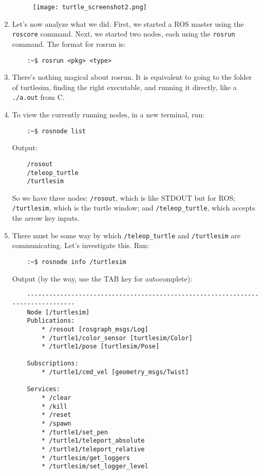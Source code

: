 \documentclass{article}
\begin{document}
\begin{enumerate}
        \begin{figure}[H]
            \center
            \texttt{[image: turtle\_screenshot2.png]}
        \end{figure}

        \item Let's now analyze what we did. First, we started a ROS master using the \texttt{roscore} 
        command. Next, we started two nodes, each using the \texttt{rosrun} command. The format for rosrun is:
        \begin{verbatim}
    :~$ rosrun <pkg> <type>
        \end{verbatim}
        \item There's nothing magical about rosrun. It is equivalent to going to the folder of turtlesim,
        finding the right executable, and running it directly, like a \texttt{./a.out} from C.
        \item To view the currently running nodes, in a new terminal, run:
        \begin{verbatim}
    :~$ rosnode list
        \end{verbatim}
        Output:
        \begin{verbatim}
    /rosout
    /teleop_turtle
    /turtlesim
        \end{verbatim}
        So we have three nodes: \texttt{/rosout}, which is like STDOUT but for ROS; \texttt{/turtlesim}, which is the turtle window;
         and \texttt{/teleop\_turtle}, which accepts the arrow key inputs.
        \item There must be some way by which \texttt{/teleop\_turtle} and \texttt{/turtlesim} are communicating.
        Let's investigate this. Run:
        \begin{verbatim}
    :~$ rosnode info /turtlesim
        \end{verbatim}
        \newpage
        Output (by the way, use the TAB key for autocomplete):
        \begin{verbatim}
    --------------------------------------------------------------------------------
    Node [/turtlesim]
    Publications: 
        * /rosout [rosgraph_msgs/Log]
        * /turtle1/color_sensor [turtlesim/Color]
        * /turtle1/pose [turtlesim/Pose]
    
    Subscriptions: 
        * /turtle1/cmd_vel [geometry_msgs/Twist]
    
    Services: 
        * /clear
        * /kill
        * /reset
        * /spawn
        * /turtle1/set_pen
        * /turtle1/teleport_absolute
        * /turtle1/teleport_relative
        * /turtlesim/get_loggers
        * /turtlesim/set_logger_level
    

\end{verbatim}
\end{enumerate}
\end{document}
